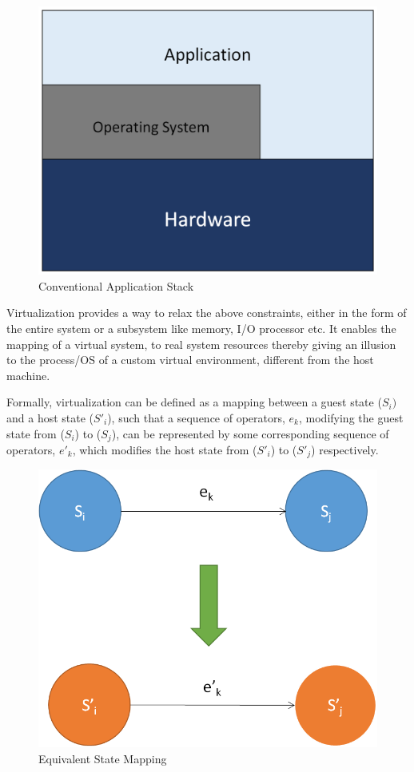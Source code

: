 \begin{figure}[H]
  \centering
  \includegraphics[scale=0.6]{figures/app_stack.png}
  \caption{Conventional Application Stack}
  \label{fig:appstack}
\end{figure}

Virtualization provides a way to relax the above constraints, either in the form of the entire system or a subsystem like memory, I/O processor etc. It enables the mapping of a virtual system, to real system resources thereby giving an illusion to the process/OS of a custom virtual environment, different from the host machine.

Formally, virtualization can be defined as a mapping between a guest state ($S_i)$ and a host state ($S'_i$), such that a sequence of operators, $e_k$, modifying the guest state from ($S_i$) to ($S_j$), can be represented by some corresponding sequence of operators, $e'_k$, which modifies the host state from ($S'_i$) to ($S'_j$) respectively. 

\setlength{\belowcaptionskip}{-10pt}

\begin{figure}[H]
  \centering
  \includegraphics[scale=0.6]{figures/vir_phy_map.png}
  \caption{Equivalent State Mapping}
  \label{fig:statemap}
\end{figure}

